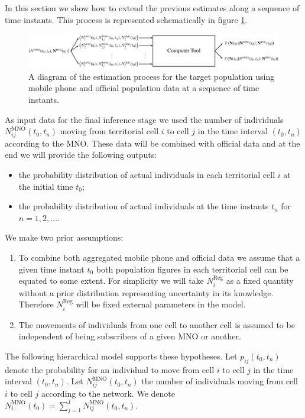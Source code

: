 \documentclass[12pt, a4paper]{article}
\begin{document}
In this section we show how to extend the previous estimates along a sequence of time instants. 
This process is represented schematically  in figure \ref{Tool2}.

\begin{figure}[htbp]
	\centering
	\includegraphics[scale=0.35]{Tool2.png}
	\caption{A diagram of the estimation process for the target population using mobile phone and official 
		population data at a sequence of time instants.}
	\label{Tool2} 
\end{figure}

As input data for the final inference stage we used the number of individuals $N_{ij}^{\textrm{MNO}}(t_{0}, t_{n})$ moving 
from territorial cell $i$ to cell $j$ in the time interval $(t_{0}, t_{n})$ according to the MNO. These data will be combined 
with official data and at the end we will  provide the following outputs:

\begin{itemize}
	\item the probability distribution of actual individuals in each territorial cell $i$ at the initial time $t_{0}$;
	\item the probability distribution of actual individuals at the time instants $t_{n}$ for $n=1,2,\dots$.
\end{itemize}  

We make two prior assumptions:

\begin{enumerate}
	\item To combine both aggregated mobile phone and official data we assume that a given time instant $t_{0}$ 
	both population figures in each territorial cell can be equated to some extent. For simplicity we will take $N_{i}^{\textrm{Reg}}$ 
	as a fixed quantity without a prior distribution representing uncertainty in its knowledge. 
	Therefore $N_{i}^{\textrm{Reg}}$ will be fixed external parameters in the model. 
	\item The movements of individuals from one cell to another cell is assumed to be independent of 
	being subscribers of a given MNO or another.
\end{enumerate}

The following hierarchical model supports these hypotheses. Let $p_{ij}(t_{0}, t_{n})$ denote the probability 
for an individual to move from cell $i$ to cell $j$ in the time interval $(t_{0}, t_{n})$. Let $N_{ij}^{\textrm{MNO}}(t_{0}, t_{n})$ the 
number of individuals moving from cell $i$ to cell $j$ according to the network. We denote $N_{i\cdot}^{\textrm{MNO}}(t_{0})=\sum_{j=1}^{I}N_{ij}^{\textrm{MNO}}(t_{0}, t_{n})$. 
\end{document}
